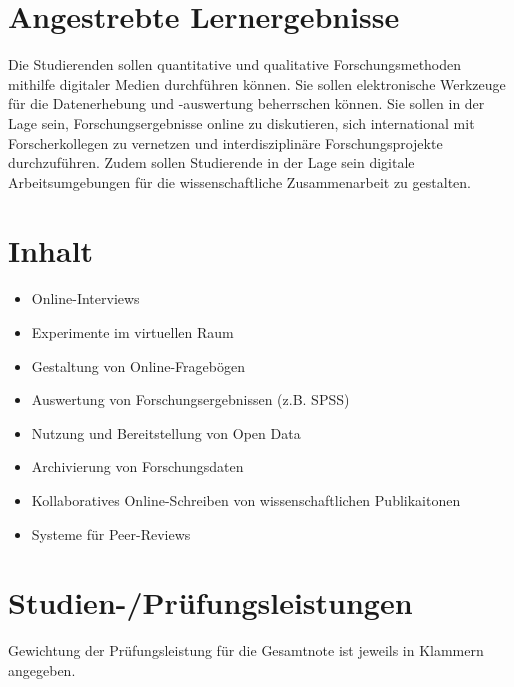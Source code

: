 \section*{Angestrebte
Lernergebnisse\label{/mi-2017/modulbeschreibungen-master/MA_SC_WPF_eScience}}\label{angestrebte-lernergebnissepathlabelmi-2017modulbeschreibungen-mastermaux5fscux5fwpfux5fescience}

Die Studierenden sollen quantitative und qualitative Forschungsmethoden
mithilfe digitaler Medien durchführen können. Sie sollen elektronische
Werkzeuge für die Datenerhebung und -auswertung beherrschen können. Sie
sollen in der Lage sein, Forschungsergebnisse online zu diskutieren,
sich international mit Forscherkollegen zu vernetzen und
interdisziplinäre Forschungsprojekte durchzuführen. Zudem sollen
Studierende in der Lage sein digitale Arbeitsumgebungen für die
wissenschaftliche Zusammenarbeit zu gestalten.

\section*{Inhalt\label{/mi-2017/modulbeschreibungen-master/MA_SC_WPF_eScience}}\label{inhaltpathlabelmi-2017modulbeschreibungen-mastermaux5fscux5fwpfux5fescience}

\begin{itemize}
\tightlist
\item
  Online-Interviews
\item
  Experimente im virtuellen Raum
\item
  Gestaltung von Online-Fragebögen
\item
  Auswertung von Forschungsergebnissen (z.B. SPSS)
\item
  Nutzung und Bereitstellung von Open Data
\item
  Archivierung von Forschungsdaten
\item
  Kollaboratives Online-Schreiben von wissenschaftlichen Publikaitonen
\item
  Systeme für Peer-Reviews
\end{itemize}

\section*{Studien-/Prüfungsleistungen\label{/mi-2017/modulbeschreibungen-master/MA_SC_WPF_eScience}}\label{studien-pruxfcfungsleistungenpathlabelmi-2017modulbeschreibungen-mastermaux5fscux5fwpfux5fescience}

Gewichtung der Prüfungsleistung für die Gesamtnote ist jeweils in
Klammern angegeben.

